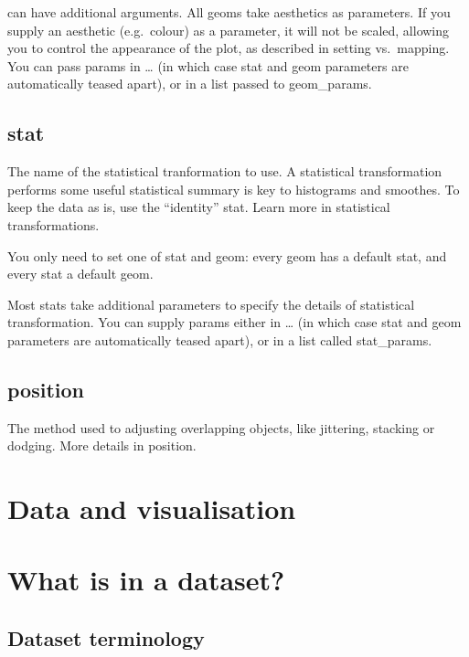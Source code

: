 \documentclass[
]{book}
\theoremstyle{definition}
\theoremstyle{definition}
\theoremstyle{definition}
\theoremstyle{definition}
\theoremstyle{remark}
\begin{document}
can have additional arguments. All geoms take aesthetics as parameters. If you supply an aesthetic (e.g.~colour) as a parameter, it will not be scaled, allowing you to control the appearance of the plot, as described in setting vs.~mapping. You can pass params in \ldots{} (in which case stat and geom parameters are automatically teased apart), or in a list passed to geom\_params.

\hypertarget{stat}{%
\section{stat}\label{stat}}

The name of the statistical tranformation to use. A statistical transformation performs some useful statistical summary is key to histograms and smoothes. To keep the data as is, use the ``identity'' stat. Learn more in statistical transformations.

You only need to set one of stat and geom: every geom has a default stat, and every stat a default geom.

Most stats take additional parameters to specify the details of statistical transformation. You can supply params either in \ldots{} (in which case stat and geom parameters are automatically teased apart), or in a list called stat\_params.

\hypertarget{position}{%
\section{position}\label{position}}

The method used to adjusting overlapping objects, like jittering, stacking or dodging. More details in position.

\hypertarget{data-and-visualisation}{%
\chapter{Data and visualisation}\label{data-and-visualisation}}

\hypertarget{what-is-in-a-dataset}{%
\chapter{What is in a dataset?}\label{what-is-in-a-dataset}}

\hypertarget{dataset-terminology}{%
\section{Dataset terminology}\label{dataset-terminology}}
\end{document}
